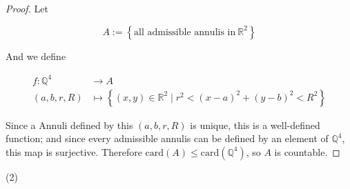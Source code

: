 \documentclass{qlnotes-export}
\begin{document}
\begin{proof}

Let

\[A := \left\{ {\text{all admissible annulis in}\ {\mathbb{R}}^{2}} \right\}\]

And we define

\[\begin{matrix}
{f:{\mathbb{Q}}^{4}} & {\rightarrow A} \\
{(a,b,r,R)} & {\mapsto\left\{ {(x,y) \in {\mathbb{R}}^{2} \mid r^{2} < (x - a)^{2} + (y - b)^{2} < R^{2}} \right\}}
\end{matrix}\]

Since a Annuli defined by this \((a,b,r,R)\) is unique, this is a well-defined function; and since every admissible annulis can be defined by an element of \({\mathbb{Q}}^{4}\), this map is surjective. Therefore \(\text{card}(A) \leq \text{card}({\mathbb{Q}}^{4})\), so \(A\) is countable.

\end{proof}

(2)
\end{document}
